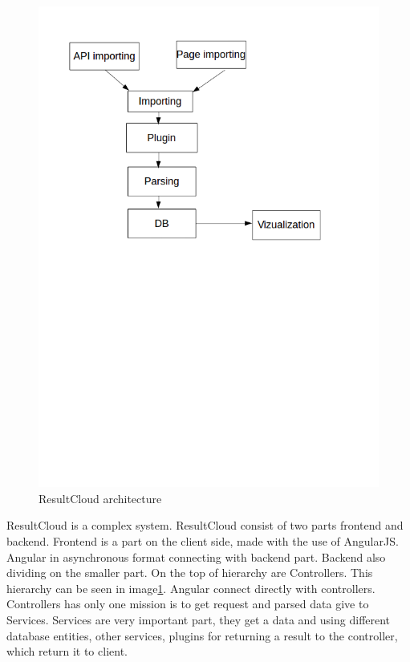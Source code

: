\begin{figure}
  \centering
    \includegraphics[trim=0 13.41cm 0 0,scale=0.5]{fig/result-cloud.png}
  \caption{ResultCloud architecture}
  \label{fig:result_cloud}
\end{figure}

ResultCloud is a complex system. ResultCloud consist of two parts frontend and backend. Frontend is a part on the client side, made with the use of AngularJS. Angular in asynchronous format connecting with backend part. Backend also dividing on the smaller part. On the top of hierarchy are Controllers. This hierarchy can be seen in image\ref{fig:result_cloud}. Angular connect directly with controllers. Controllers has only one mission is to get request and parsed data give to Services. Services are very important part, they get a data and using different database entities, other services, plugins for returning a result to the controller, which return it to client. 


